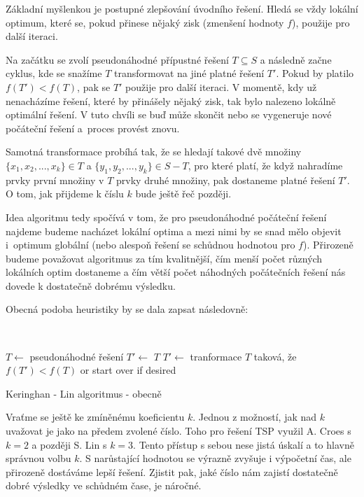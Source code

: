\documentclass[
  biblatex,
  figures=false,
  glossaries,
  index
]{kidiplom}
\begin{document}
Základní myšlenkou je postupné zlepšování úvodního řešení. Hledá se vždy lokální optimum, které se, pokud přinese nějaký zisk (zmenšení hodnoty $f$), použije pro další iteraci.

Na začátku se zvolí pseudonáhodné přípustné řešení $T \subseteq S$ a následně začne cyklus, kde se snažíme $T$ transformovat na jiné platné řešení $T'$. Pokud by platilo $f(T') < f(T)$, pak se $T'$ použije pro další iteraci. V momentě, kdy už nenacházíme řešení, které by přinášely nějaký zisk, tak bylo nalezeno lokálně optimální řešení. V tuto chvíli se buď může skončit nebo se vygeneruje nové počáteční řešení a~proces provést znovu.

\sloppy Samotná transformace probíhá tak, že se hledají takové dvě množiny $\{{x_1, x_2, ..., x_k\} \in T}$ a $\{y_1, y_2, ..., y_k\} \in S - T$, pro které platí, že když nahradíme prvky první množiny v $T$ prvky druhé množiny, pak dostaneme platné řešení $T'$. O tom, jak přijdeme k číslu $k$ bude ještě řeč později.

Idea algoritmu tedy spočívá v tom, že pro pseudonáhodné počáteční řešení najdeme budeme nacházet lokální optima a mezi nimi by se snad mělo objevit i~optimum globální (nebo alespoň řešení se schůdnou hodnotou pro $f$). Přirozeně budeme považovat algoritmus za tím kvalitnější, čím menší počet různých lokálních optim dostaneme a čím větší počet náhodných počátečních řešení nás dovede k dostatečně dobrému výsledku.

Obecná podoba heuristiky by se dala zapsat následovně:\newline


{\LinesNumbered\SetAlgoNoLine\
\begin{algorithm}[H]
$T \leftarrow$ pseudonáhodné řešení\;
$T' \leftarrow$ $T$\;
{
	$T' \leftarrow$ tranformace $T$ taková, že $f(T') < f(T)$\;
}
\Return or start over if desired\;
\caption{Keringhan - Lin algoritmus - obecně}
\end{algorithm}
}\leavevmode\newline

Vraťme se ještě ke zmíněnému koeficientu $k$. Jednou z možností, jak nad $k$ uvažovat je jako na předem zvolené číslo. Toho pro řešení TSP využil A. Croes s $k = 2$ a později S. Lin s $k = 3$. Tento přístup s sebou nese jistá úskalí a to hlavně správnou volbu $k$. S narůstající hodnotou se výrazně zvyšuje i výpočetní čas, ale přirozeně dostáváme lepší řešení. Zjistit pak, jaké číslo nám zajistí dostatečně dobré výsledky ve schůdném čase, je náročné.
\end{document}
